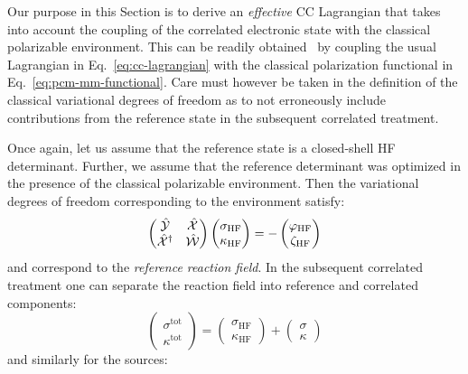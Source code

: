 Our purpose in this Section is to derive an \emph{effective} \acs{CC}
Lagrangian that takes into account the coupling of the correlated
electronic state with the classical polarizable
environment.
This can be readily obtained~\autocite{Lipparini2016-mo} by coupling the
usual Lagrangian in Eq.~\eqref{eq:cc-lagrangian} with the classical
polarization functional in Eq.~\eqref{eq:pcm-mm-functional}.
Care must however be taken in the definition of the classical
variational degrees of freedom as to not erroneously include
contributions from the reference state in the subsequent correlated
treatment.

Once again, let us assume that the reference state is a closed-shell
\acs{HF} determinant. Further, we assume that the reference determinant
was optimized in the presence of the classical polarizable environment.
Then the variational degrees of freedom corresponding to the environment
satisfy:
\begin{equation}
  \begin{pmatrix}
    \hat{\mathcal{Y}} & \hat{\mathcal{X}} \\
    \hat{\mathcal{X}}^\dagger & \hat{\mathcal{W}}
  \end{pmatrix}
  \begin{pmatrix}
   \sigma_\mathrm{HF} \\
   \kappa_\mathrm{HF}
  \end{pmatrix}
  =
  -
  \begin{pmatrix}
   \varphi_\mathrm{HF} \\
   \zeta_\mathrm{HF}
  \end{pmatrix}
\end{equation}
and correspond to the \emph{reference reaction field}.
In the subsequent correlated treatment one can separate the reaction
field into reference and correlated components:
\begin{equation}
  \begin{pmatrix}
   \sigma^\mathrm{tot} \\
   \kappa^\mathrm{tot}
  \end{pmatrix}
  =
  \begin{pmatrix}
   \sigma_\mathrm{HF} \\
   \kappa_\mathrm{HF}
  \end{pmatrix}
  +
  \begin{pmatrix}
   \sigma \\
   \kappa
  \end{pmatrix}
\end{equation}
and similarly for the sources:

